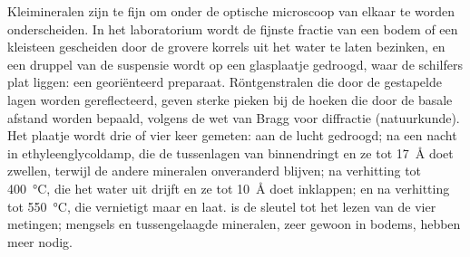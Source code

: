 \begin{inthelab}
Kleimineralen zijn te fijn om onder de optische microscoop van elkaar te worden onderscheiden. In het laboratorium wordt de fijnste fractie van een bodem of een kleisteen gescheiden door de grovere korrels uit het water te laten bezinken, en een druppel van de suspensie wordt op een glasplaatje gedroogd, waar de schilfers plat liggen: een georiënteerd preparaat. Röntgenstralen die door de gestapelde lagen worden gereflecteerd, geven sterke pieken bij de hoeken die door de basale afstand worden bepaald, volgens de wet van Bragg voor diffractie (natuurkunde). Het plaatje wordt drie of vier keer gemeten: aan de lucht gedroogd; na een nacht in ethyleenglycoldamp, die de tussenlagen van  binnendringt en ze tot \SI{17}{\angstrom} doet zwellen, terwijl de andere mineralen onveranderd blijven; na verhitting tot \SI{400}{\celsius}, die het water uit  drijft en ze tot \SI{10}{\angstrom} doet inklappen; en na verhitting tot \SI{550}{\celsius}, die  vernietigt maar  en  laat.  is de sleutel tot het lezen van de vier metingen; mengsels en tussengelaagde mineralen, zeer gewoon in bodems, hebben meer nodig.
\end{inthelab}

